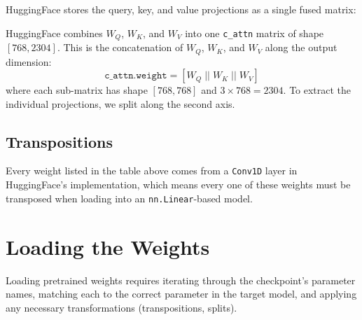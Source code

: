 HuggingFace stores the query, key, and value projections as a single fused
matrix:

\begin{keyconcept}
  HuggingFace combines $W_Q$, $W_K$, and $W_V$ into one
  \texttt{c\_attn} matrix of shape $[768, 2304]$. This is the
  concatenation of $W_Q$, $W_K$, and $W_V$ along the output dimension:
  \[
    \texttt{c\_attn.weight} = [W_Q \;||\; W_K \;||\; W_V]
  \]
  where each sub-matrix has shape $[768, 768]$ and $3 \times 768 = 2304$.
  To extract the individual projections, we split along the second axis.
\end{keyconcept}

\subsection{Transpositions}

Every weight listed in the table above comes from a \texttt{Conv1D} layer
in HuggingFace's implementation, which means every one of these weights
must be transposed when loading into an \texttt{nn.Linear}-based model.

\section{Loading the Weights}

Loading pretrained weights requires iterating through the checkpoint's
parameter names, matching each to the correct parameter in the target
model, and applying any necessary transformations (transpositions,
splits).

